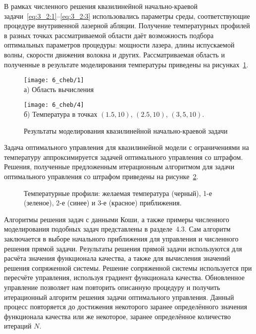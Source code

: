 В рамках численного решения квазилинейной начально-краевой задачи~\eqref{eq:3_2:1}--\eqref{eq:3_2:3}
использовались параметры среды, соответствующие процедуре внутривенной лазерной абляции.
Получение температурных профилей в разных точках рассматриваемой области
даёт возможность подбора оптимальных параметров процедуры: мощности лазера,
длины испускаемой волны, скорости движения волокна и других.
Рассматриваемая область и полученные в результате моделирования температуры
приведены на рисунках~\ref{fig:4_3:3}.
\begin{figure}[h!t]
    \begin{minipage}[b][][b]{0.49\linewidth}
        \centering
        \texttt{[image: 6\_cheb/1]}
        \\ а) Область вычисления
    \end{minipage}
    \hfill
    \begin{minipage}[b][][b]{0.49\linewidth}
        \centering
        \texttt{[image: 6\_cheb/4]}
        \\ б) Температура в точках $(1.5,10)$, $(2.5,10)$, $(3,5,10)$.
    \end{minipage}
    \caption{Результаты моделирования квазилинейной начально-краевой задачи}
    \label{fig:4_3:3}
\end{figure}


Задача оптимального управления для квазилинейной модели с ограничениями на
температуру аппроксимируется задачей оптимального управления со штрафом.
Решения, полученные предложенным итерационным алгоритмом для задачи оптимального управления
со штрафом приведены на рисунке~\ref{fig:4_3:7}.
\begin{figure}[h!t]
    \caption{Температурные профили: желаемая температура (черный),
        1-е (зеленое), 2-е (синее) и 3-е (красное) приближения.}
    \label{fig:4_3:7}
\end{figure}


Алгоритмы решения задач с данными Коши, а также примеры численного
моделирования подобных задач представлены в разделе~4.3.
Сам алгоритм заключается в выборе начального приближения
для управления и численного решения прямой задачи.
Результаты решения прямой задачи используются для расчёта значения функционала качества,
а также для вычисления значений решения сопряженной системы.
Решение сопряженной системы используется при пересчёте управления,
используя градиент функционала качества.
Обновленное управление позволяет нам повторить описанную процедуру и получить итерационный
алгоритм решения задачи оптимального управления.
Данный процесс повторяется до достижения некоторого заранее определённого значения функционала
качества или же некоторое, заранее определённое количество итераций $N$.


